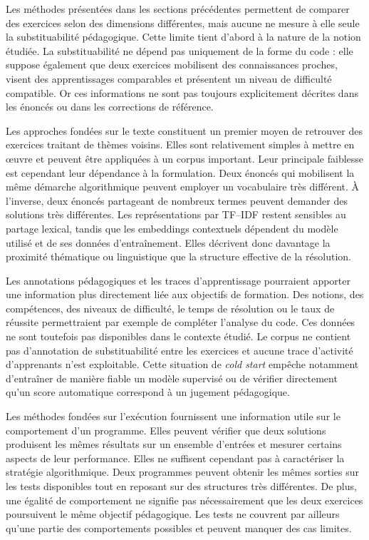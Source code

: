 \documentclass[12pt,a4paper,oneside]{report}
\begin{document}
Les méthodes présentées dans les sections précédentes permettent de comparer
des exercices selon des dimensions différentes, mais aucune ne mesure à elle
seule la substituabilité pédagogique. Cette limite tient d'abord à la nature
de la notion étudiée. La substituabilité ne dépend pas uniquement de la forme
du code : elle suppose également que deux exercices mobilisent des
connaissances proches, visent des apprentissages comparables et présentent un
niveau de difficulté compatible. Or ces informations ne sont pas toujours
explicitement décrites dans les énoncés ou dans les corrections de référence.

Les approches fondées sur le texte constituent un premier moyen de retrouver
des exercices traitant de thèmes voisins. Elles sont relativement simples à
mettre en œuvre et peuvent être appliquées à un corpus important. Leur
principale faiblesse est cependant leur dépendance à la formulation. Deux
énoncés qui mobilisent la même démarche algorithmique peuvent employer un
vocabulaire très différent. À l'inverse, deux énoncés partageant de nombreux
termes peuvent demander des solutions très différentes. Les représentations
par TF--IDF restent sensibles au partage lexical, tandis que les embeddings
contextuels dépendent du modèle utilisé et de ses données d'entraînement.
Elles décrivent donc davantage la proximité thématique ou linguistique que la
structure effective de la résolution.

Les annotations pédagogiques et les traces d'apprentissage pourraient apporter
une information plus directement liée aux objectifs de formation. Des notions,
des compétences, des niveaux de difficulté, le temps de résolution ou le taux
de réussite permettraient par exemple de compléter l'analyse du code. Ces
données ne sont toutefois pas disponibles dans le contexte étudié. Le corpus
ne contient pas d'annotation de substituabilité entre les exercices et aucune
trace d'activité d'apprenants n'est exploitable. Cette situation de
\emph{cold start} empêche notamment d'entraîner de manière fiable un modèle
supervisé ou de vérifier directement qu'un score automatique correspond à un
jugement pédagogique.

Les méthodes fondées sur l'exécution fournissent une information utile sur le
comportement d'un programme. Elles peuvent vérifier que deux solutions
produisent les mêmes résultats sur un ensemble d'entrées et mesurer certains
aspects de leur performance. Elles ne suffisent cependant pas à caractériser
la stratégie algorithmique. Deux programmes peuvent obtenir les mêmes sorties
sur les tests disponibles tout en reposant sur des structures très différentes.
De plus, une égalité de comportement ne signifie pas nécessairement que les
deux exercices poursuivent le même objectif pédagogique. Les tests ne couvrent
par ailleurs qu'une partie des comportements possibles et peuvent manquer des
cas limites.
\end{document}
